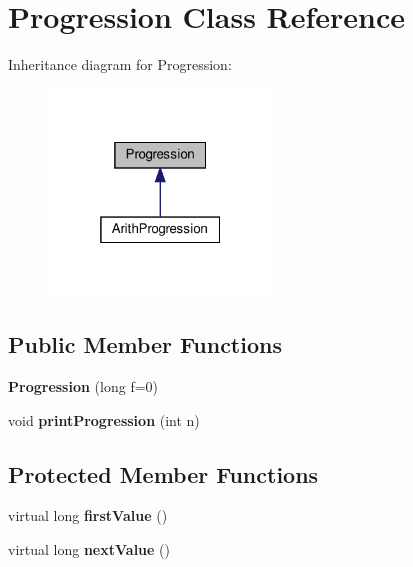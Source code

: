 \hypertarget{classProgression}{}\section{Progression Class Reference}
\label{classProgression}


Inheritance diagram for Progression\+:\nopagebreak
\begin{figure}[H]
\begin{center}
\leavevmode
\includegraphics[width=169pt]{classProgression__inherit__graph}
\end{center}
\end{figure}
\subsection*{Public Member Functions}
\begin{DoxyCompactItemize}
\item 
\mbox{\label{classProgression_a4d746d05334214c18f8cda8ff6006659}} 
{\bfseries Progression} (long f=0)
\item 
\mbox{\label{classProgression_ad652f1d934da13b088422f675212e1fd}} 
void {\bfseries print\+Progression} (int n)
\end{DoxyCompactItemize}
\subsection*{Protected Member Functions}
\begin{DoxyCompactItemize}
\item 
\mbox{\label{classProgression_aa930e887ec5fc8ba27c358e43d561393}} 
virtual long {\bfseries first\+Value} ()
\item 
\mbox{\label{classProgression_a52e78526540e4e1f1194a2936160e9a4}} 
virtual long {\bfseries next\+Value} ()
\end{DoxyCompactItemize}
